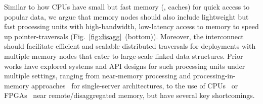 Similar to how CPUs have small but fast memory (\ie, caches) for quick access to popular data, we argue that memory nodes should also include lightweight but fast processing units with high-bandwidth, low-latency access to memory to speed up pointer-traversals (Fig.~\ref{fig:disagg}~(bottom)). Moreover, the interconnect should facilitate efficient and scalable distributed traversals for deployments with multiple memory nodes that cater to large-scale linked data structures. Prior works have explored systems and API designs for such processing units under multiple settings, ranging from near-memory processing and processing-in-memory approaches~\cite{ahn2015scalable, asghari2016chameleon,  dai2018graphh, schuiki2018scalable, mutlu2019processing, lockerman2020livia, tu2022redcim, devic2022_PIM, wang2022_Nearstream, xie2023mpu, mutlu2022modern, oliveira2022accelerating, eckert2022eidetic, chi2016prime, seshadri2017simple, kwon2019_TensorDIMM, boroumand2019_codna, cho2020_data, ke2020_RecNMP, wang2021stream, xie2021spacea, ke2021near, singh2021fpga, olgun2022pidram, dai2022dimmining, gu2020ipim, gomez2023evaluating, walkers, impica} for single-server architectures, to the use of CPUs~\cite{storagefunctions, splinter, aifm, kayak_nsdi_21, storm_systor_19, zhang2022_teleport} or FPGAs~\cite{clio, strom} near remote/disaggregated memory, but have several key shortcomings. 

